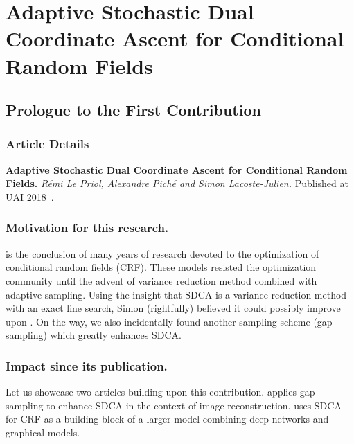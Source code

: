 \setcounter{theorem}{0}

\def\balpha{\boldsymbol{\alpha}}
\def\bmu{\boldsymbol{\mu}}
\def\bw{\boldsymbol{w}}
\newcommand{\bu}{\bm u}
\newcommand{\bv}{\bm v}
\newcommand{\strgconvex}{\mu}
\newcommand{\QM}{QM} %


\chapter{Adaptive Stochastic Dual Coordinate Ascent for Conditional Random Fields}
\label{ch:sdca}

\section*{Prologue to the First Contribution}


\subsection*{Article Details}

\textbf{Adaptive Stochastic Dual Coordinate Ascent for Conditional Random Fields.}
\emph{R\'emi Le Priol, Alexandre Pich\'e and Simon Lacoste-Julien.}
Published at UAI 2018~\citep{lepriol2018adaptive}.

\subsection*{Motivation for this research.}
\citet{schmidt2015non} is the conclusion of many years of research devoted to the optimization of conditional random fields (CRF). 
These models resisted the optimization community until the advent of variance reduction method combined with adaptive sampling. 
Using the insight that SDCA is a variance reduction method with an exact line search, Simon (rightfully) believed it could possibly improve upon \citet{schmidt2015non}. 
On the way, we also incidentally found another sampling scheme (gap sampling) which greatly enhances SDCA. 


\subsection*{Impact since its publication.}
Let us showcase two articles building upon this contribution. \citet{eboli2020structured}  applies gap sampling to enhance SDCA in the context of image reconstruction. \citet{yaakoubi2021structured} uses SDCA for CRF as a building block of a larger model combining deep networks and graphical models. 



